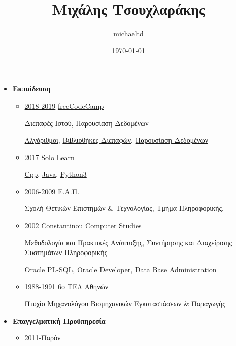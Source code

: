 \documentclass[11pt]{article}
\author{michaeltd}
\date{\today}
\title{Μιχάλης Τσουχλαράκης}
\begin{document}
\maketitle
\begin{itemize}
\item \textbf{Εκπαίδευση}

\begin{itemize}
\item \uline{2018-2019} \href{https://www.freecodecamp.org/michaeltd}{freeCodeCamp}

\href{https://www.freecodecamp.org/certification/michaeltd/legacy-front-end}{Διεπαφές Ιστού}, \href{https://www.freecodecamp.org/certification/michaeltd/legacy-data-visualization}{Παρουσίαση Δεδομένων}

\href{https://www.freecodecamp.org/certification/michaeltd/javascript-algorithms-and-data-structures}{Αλγόριθμοι}, \href{https://www.freecodecamp.org/certification/michaeltd/front-end-libraries}{Βιβλιοθήκες Διεπαφών}, \href{https://www.freecodecamp.org/certification/michaeltd/data-visualization}{Παρουσίαση Δεδομένων}

\item \uline{2017} \href{https://www.sololearn.com/Profile/4692870/}{Solo Learn}

\href{https://www.sololearn.com/Certificate/1051-4692870/pdf/}{Cpp}, \href{https://www.sololearn.com/Certificate/1068-4692870/pdf/}{Java}, \href{https://www.sololearn.com/Certificate/1073-4692870/pdf/}{Python3}

\item \uline{2006-2009} \href{https://www.eap.gr/el/}{Ε.Α.Π.}

Σχολή Θετικών Επιστημών \& Τεχνολογίας, Τμήμα Πληροφορικής.

\item \uline{2002} Constantinou Computer Studies

Μεθοδολογία και Πρακτικές Ανάπτυξης, Συντήρησης και Διαχείρισης Συστημάτων Πληροφορικής

Oracle PL-SQL, Oracle Developer, Data Base Administration

\item \uline{1988-1991} 6ο ΤΕΛ Αθηνών

Πτυχίο Μηχανολόγου Βιομηχανικών Εγκαταστάσεων \& Παραγωγής
\end{itemize}

\item \textbf{Επαγγελματική Προϋπηρεσία}

\begin{itemize}
\item \uline{2011-Παρόν}


\end{itemize}
\end{itemize}
\end{document}
